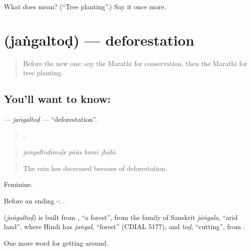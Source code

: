 \begin{tcolorbox}[breakable,colback=teal!4,colframe=teal!35!black,title={Before you move on}]
What does  mean? (\textquotedblleft{}Tree planting\textquotedblright{}.) Say it once more.
\end{tcolorbox}
\section[\texorpdfstring{\mr{जंगलतोड} (jaṅgaltoḍ)}{जंगलतोड (jaṅgaltoḍ)}]{ (jaṅgaltoḍ) — deforestation}

\label{lesson:MR-C449-jangaltod}



\begin{quote}
Before the new one: say the Marathi for conservation, then the Marathi for tree planting.
\end{quote}

\subsection*{You'll want to know: }
\textbf{} — \emph{jaṅgaltoḍ} — \textquotedblleft{}deforestation\textquotedblright{}.

\begin{quote}
   .
\end{quote}

\begin{quote}
\emph{jaṅgaltoḍīmuḷe pāūs kamī jhālā.}
\end{quote}

\begin{quote}
The rain has decreased because of deforestation.
\end{quote}

Feminine.

Before an ending -: .

\begin{cousinweb}
\textbf{} (\emph{jaṅgaltoḍ}) is built from \textbf{}, \textquotedblleft{}a forest\textquotedblright{}, from the family of Sanskrit \emph{jāṅgala}, \textquotedblleft{}arid land\textquotedblright{}, where Hindi has \emph{jaṅgal}, \textquotedblleft{}forest\textquotedblright{} (CDIAL 5177), and \emph{toḍ}, \textquotedblleft{}cutting\textquotedblright{}, from \textbf{}.
\end{cousinweb}

\begin{grammarlens}[title={What you've built}]
One more word for getting around.
\end{grammarlens}

